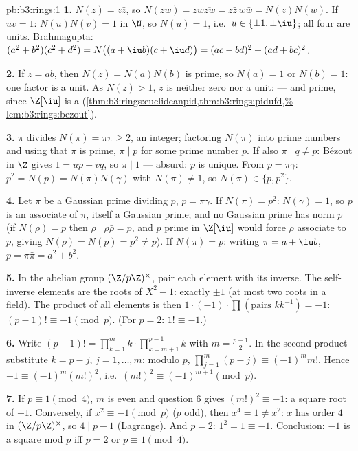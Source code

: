 \begin{solution}{pb:b3:rings:1}
\textbf{1.} $N(z) = z\bar z$, so $N(zw) = zw\overline{zw} = z\bar
z\, w \bar w = N(z)N(w)$. If $uv = 1$: $N(u)N(v) = 1$ in $\N$, so
$N(u) = 1$, i.e.\ $u \in \{\pm 1, \pm \iu\}$; all four are units.
Brahmagupta: $(a^2+b^2)(c^2+d^2) = N\bigl((a + \iu b)(c + \iu
d)\bigr) = (ac - bd)^2 + (ad + bc)^2$.

\textbf{2.} If $z = ab$, then $N(z) = N(a)N(b)$ is prime, so
$N(a) = 1$ or $N(b) = 1$: one factor is a unit. As $N(z) > 1$,
$z$ is neither zero nor a unit:  --- and prime, since
$\Z[\iu]$ is a 
(\cref{thm:b3:rings:euclideanpid,thm:b3:rings:pidufd,%
lem:b3:rings:bezout}).

\textbf{3.} $\pi$ divides $N(\pi) = \pi\bar\pi \geq 2$, an
integer; factoring $N(\pi)$ into prime numbers and using that
$\pi$ is prime, $\pi \mid p$ for some prime number $p$. If also
$\pi \mid q \neq p$: B\'ezout in $\Z$ gives $1 = up + vq$, so
$\pi \mid 1$ --- absurd: $p$ is unique. From $p = \pi\gamma$:
$p^2 = N(p) = N(\pi)N(\gamma)$ with $N(\pi) \neq 1$, so $N(\pi)
\in \{p, p^2\}$.

\textbf{4.} Let $\pi$ be a Gaussian prime dividing $p$, $p =
\pi\gamma$. If $N(\pi) = p^2$: $N(\gamma) = 1$, so $p$ is an
associate of $\pi$, itself a Gaussian prime; and no Gaussian
prime has norm $p$ (if $N(\rho) = p$ then $\rho \mid
\rho\bar\rho = p$, and $p$ prime in $\Z[\iu]$ would force
$\rho$ associate to $p$, giving $N(\rho) = N(p) = p^2 \neq
p$).
If $N(\pi) = p$: writing $\pi = a + \iu b$, $p = \pi\bar\pi = a^2
+ b^2$.

\textbf{5.} In the abelian group $(\Z/p\Z)^\times$, pair each
element with its inverse. The self-inverse elements are the roots
of $X^2 - 1$: exactly $\pm 1$ (at most two roots in a field).
The product of all elements is then $1 \cdot (-1) \cdot \prod
(\text{pairs } k k^{-1}) = -1$: $(p-1)! \equiv -1 \pmod p$. (For
$p = 2$: $1! \equiv -1$.)

\textbf{6.} Write $(p-1)! = \prod_{k=1}^m k \cdot
\prod_{k=m+1}^{p-1}k$ with $m = \frac{p-1}2$. In the second
product substitute $k = p - j$, $j = 1, \dots, m$: modulo $p$,
$\prod_{j=1}^m (p - j) \equiv (-1)^m m!$. Hence $-1 \equiv
(-1)^m (m!)^2$, i.e.\ $(m!)^2 \equiv (-1)^{m+1} \pmod p$.

\textbf{7.} If $p \equiv 1 \pmod 4$, $m$ is even and question 6
gives $(m!)^2 \equiv -1$: a square root of $-1$. Conversely, if
$x^2 \equiv -1 \pmod p$ ($p$ odd), then $x^4 = 1 \neq x^2$: $x$
has order $4$ in $(\Z/p\Z)^\times$, so $4 \mid p - 1$ (Lagrange).
And $p = 2$: $1^2 = 1 \equiv -1$. Conclusion: $-1$ is a square
mod $p$ iff $p = 2$ or $p \equiv 1 \pmod 4$.


\end{solution}
